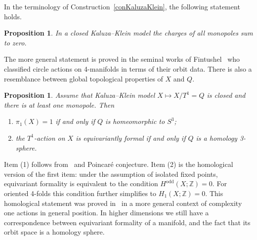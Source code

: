 \documentclass[english,12pt,oneside]{amsproc}
\DeclareMathOperator{\odd}{odd}
\newcommand{\Zo}{\mathbb{Z}}
\newcounter{stmcounter}[section]
\numberwithin{equation}{section}
\theoremstyle{plain}
\newtheorem{prop}[stmcounter]{Proposition}
\theoremstyle{definition}
\theoremstyle{remark}
\begin{document}
In the terminology of Construction~\ref{conKaluzaKlein}, the following statement holds.

\begin{prop}\label{propSumCharges}
In a closed Kaluza--Klein model the charges of all monopoles sum to zero.
\end{prop}

The more general statement is proved in the seminal works of Fintushel~\cite{Fint1, Fint2} who classified circle actions on 4-manifolds in terms of their orbit data. There is also a resemblance between global topological properties of $X$ and $Q$.

\begin{prop}\label{propSpheres}
Assume that Kaluza--Klein model $X\mapsto X/T^1=Q$ is closed and there is at least one monopole. Then
\begin{enumerate}
  \item $\pi_1(X)=1$ if and only if $Q$ is homeomorphic to $S^3$;
  \item the $T^1$-action on $X$ is equivariantly formal if and only if $Q$ is a homology 3-sphere.
\end{enumerate}
\end{prop}

Item (1) follows from~\cite{Fint1} and Poincar\'{e} conjecture. Item (2) is the homological version of the first item: under the assumption of isolated fixed points, equivariant formality is equivalent to the condition $H^{\odd}(X;\Zo)=0$. For oriented 4-folds this condition further simplifies to $H_1(X;\Zo)=0$. This homological statement was proved in~\cite{AyzMasEquiv} in a more general context of complexity one actions in general position. In higher dimensions we still have a correspondence between equivariant formality of a manifold, and the fact that its orbit space is a homology sphere.
\end{document}
